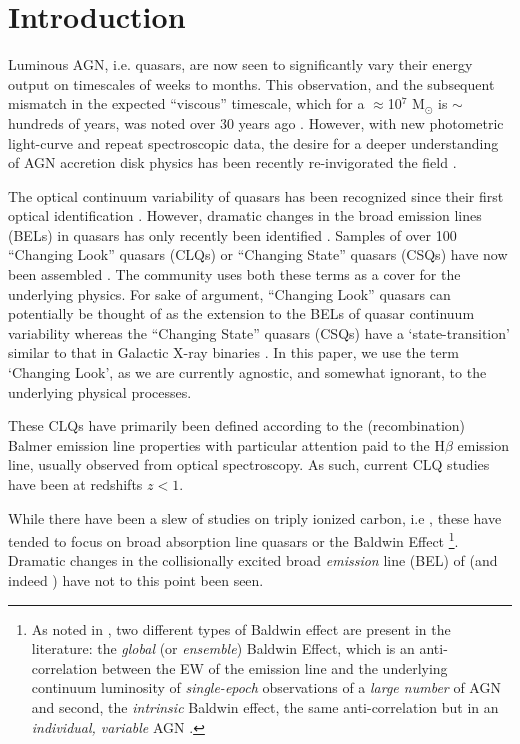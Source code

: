 \documentclass[a4paper,fleqn,usenatbib]{mnras}
\begin{document}
\section{Introduction}
Luminous AGN, i.e. quasars, are now seen to significantly vary their
energy output on timescales of weeks to months.  This observation, and
the subsequent mismatch in the expected ``viscous'' timescale, which
for a $\approx$10$^{7}$ M$_{\odot}$ is $\sim$hundreds of years, was
noted over 30 years ago \citep[e.g.][]{Alloin1985}. However, with new
photometric light-curve and repeat spectroscopic data, the desire for
a deeper understanding of AGN accretion disk physics has been recently
re-invigorated the field \citep[e.g.][]{Lawrence2018, Antonucci2018}.

The optical continuum variability of quasars has been recognized since
their first optical identification
\citep[e.g.,][]{MatthewsSandage1963, MacLeod2012}.  However, dramatic
changes in the broad emission lines (BELs) in quasars has only
recently been identified \citep[e.g.][]{LaMassa2015}.  Samples of over
100 ``Changing Look'' quasars (CLQs) or ``Changing State'' quasars
(CSQs) have now been assembled \citep[e.g.][]{MacLeod2019,Graham2019}.
The community uses both these terms as a cover for the underlying
physics. For sake of argument, ``Changing Look'' quasars can
potentially be thought of as the extension to the BELs of quasar
continuum variability \citep[e.g.][]{MacLeod2012} whereas the
``Changing State'' quasars (CSQs) have a `state-transition' similar to
that in Galactic X-ray binaries \citep[e.g][]{NodaDone2018,
Ruan2019}. In this paper, we use the term `Changing Look', as we are
currently agnostic, and somewhat ignorant, to the underlying physical
processes.

These CLQs have primarily been defined according to the
(recombination) Balmer emission line properties with particular
attention paid to the H$\beta$ emission line, usually observed from
optical spectroscopy.  As such, current CLQ studies have been at
redshifts $z<1$.

While there have been a slew of studies on triply ionized carbon, i.e
\civ, these have tended to focus on broad absorption line quasars
\citep[BAL QSOs; see e.g. Table 1][]{Hemler2019} or the Baldwin Effect
\citep[BEff; e.g. ][]{Baldwin1977, Bian2012, Jensen2016,
Hamann2017}\footnote{As noted in \citet{Rakic2017}, two different
types of Baldwin effect are present in the literature: the {\it
global} (or {\it ensemble}) Baldwin Effect, which is an
anti-correlation between the EW of the emission line and the
underlying continuum luminosity of {\it single-epoch} observations of
a {\it large number} of AGN and second, the {\it intrinsic} Baldwin
effect, the same anti-correlation but in an {\it individual, variable}
AGN \citep{PoggePeterson1992}.}.  Dramatic changes in the
collisionally excited broad {\it emission} line (BEL) of \civ (and
indeed \ciii) have not to this point been seen.
\end{document}
